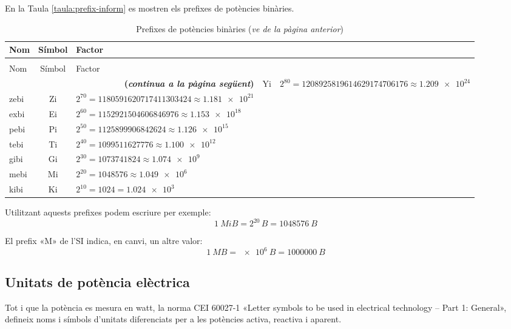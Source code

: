 En la Taula \vref{taula:prefix-inform} es mostren els prefixes de potències binàries.
\begin{longtable}[h]{lcl}
   \caption{\label{taula:prefix-inform} Prefixes de potències binàries}\\
   \toprule[1pt]
    Nom & Símbol  & Factor \\
   \midrule
   \endfirsthead
   \caption[]{Prefixes de potències binàries (\emph{ve de la pàgina anterior})}\\
   \toprule[1pt]
    Nom & Símbol  & Factor \\
   \midrule
   \endhead
   \midrule
   \multicolumn{3}{r}{\sffamily\bfseries\color{NavyBlue}(\emph{continua a la pàgina següent})}
   \endfoot
   \endlastfoot
   yobi & Yi   & $2^{80} = \num{1208925819614629174706176}\approx \num{1,209e24}$ \\
   zebi & Zi   & $2^{70} = \num{1180591620717411303424}\approx \num{1,181e21}$ \\
   exbi & Ei   & $2^{60} = \num{1152921504606846976}\approx \num{1,153e18}$ \\
   pebi & Pi   & $2^{50} = \num{1125899906842624}\approx \num{1,126e15}$ \\
   tebi & Ti   & $2^{40} = \num{1099511627776}\approx \num{1,100e12}$ \\
   gibi & Gi   & $2^{30} = \num{1073741824}\approx \num{1,074e9}$  \\
   mebi & Mi   & $2^{20} = \num{1048576} \approx \num{1,049e6}$ \\
   kibi & Ki   & $2^{10} = 1024 =\num{1,024e3}$  \\
   \bottomrule[1pt]
\end{longtable}
        
   

Utilitzant aquests prefixes podem escriure per exemple:
\[\SI{1}{MiB} = 2^{20}\si{\,B} = \SI{1048576}{B}\]

El prefix «M» de l'SI indica, en canvi, un altre valor:
\[\SI{1}{MB} =\SI{e6}{B} = \SI{1000000}{B}\]


\subsection{Unitats de potència elèctrica}

Tot i que la potència es mesura en watt, la norma CEI 60027-1 «Letter symbols to be used in electrical technology -- Part 1: General», defineix noms i símbols d'unitats diferenciats per a les potències activa, reactiva i aparent.

